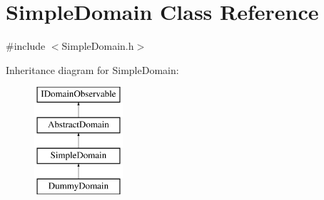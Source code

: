 \hypertarget{class_simple_domain}{}\section{Simple\+Domain Class Reference}
\label{class_simple_domain}


{\ttfamily \#include $<$Simple\+Domain.\+h$>$}

Inheritance diagram for Simple\+Domain\+:\begin{figure}[H]
\begin{center}
\leavevmode
\includegraphics[height=4.000000cm]{d2/d85/class_simple_domain}
\end{center}
\end{figure}

